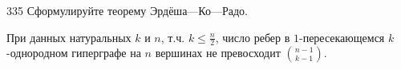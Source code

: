 \begin{task}{335}
Сформулируйте теорему Эрдёша—Ко—Радо.
\end{task}

\begin{solution}
При данных натуральных $k$ и $n$, т.ч. $k\leq\frac{n}{2}$, число ребер в $1$-пересекающемся $k$-однородном гиперграфе на $n$ вершинах не превосходит $\binom{n-1}{k-1}$.
\end{solution} 